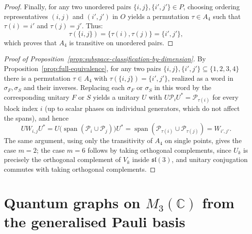 \begin{proof}
    Finally, for any two unordered pairs \( \{i,j\}, \{i',j'\} \in
    P \), choosing ordering representatives \( (i,j) \) and
    \( (i',j') \) in \( O \) yields a permutation \( \tau
    \in A_4 \) such that \( \tau(i) = i' \) and \( \tau(j) = j' \). Thus:
    \[
        \tau(\{i,j\}) = \{ \tau(i), \tau(j) \} = \{ i', j' \},
    \]
    which proves that \( A_4 \) is transitive on unordered pairs.
\end{proof}

\begin{proof}[Proof of
    Proposition~\ref{prop:subspace-classification-by-dimension}]
    By Proposition~\ref{prop:full-equivalence}, for any two pairs
    \( \{i,j\}, \{i',j'\} \subseteq \{1,2,3,4\} \) there is a
    permutation \( \tau \in A_4 \) with \( \tau(\{i,j\}) = \{i',j'\} \),
    realized as a word in \( \sigma_F, \sigma_S \) and their inverses.
    Replacing each \( \sigma_F \) or \( \sigma_S \) in this word by the
    corresponding unitary \( F \) or \( S \) yields a unitary \( U \)
    with \( U\mathcal{P}_iU^* = \mathcal{P}_{\tau(i)} \) for every block
    index \( i \) (up to scalar phases on individual generators, which
    do not affect the spans), and hence
    \[
        UW_{i,j}U^* = U\big(\operatorname{span}(\mathcal{P}_i \cup
        \mathcal{P}_j)\big)U^*
        = \operatorname{span}(\mathcal{P}_{\tau(i)} \cup
        \mathcal{P}_{\tau(j)}) = W_{i',j'}.
    \]
    The same argument, using only the transitivity of \( A_4 \) on
    single points, gives the case \( m=2 \); the case \( m=6 \) follows
    by taking orthogonal complements, since \( U_k \) is precisely the
    orthogonal complement of \( V_k \) inside \( \mathfrak{sl}(3) \), and
    unitary conjugation commutes with taking orthogonal complements.
\end{proof}

\section{Quantum graphs on \( M_{3}(\mathbb{C}) \) from the
generalised Pauli basis}
\label{sec:classification-loopfree-undirected-m3}

